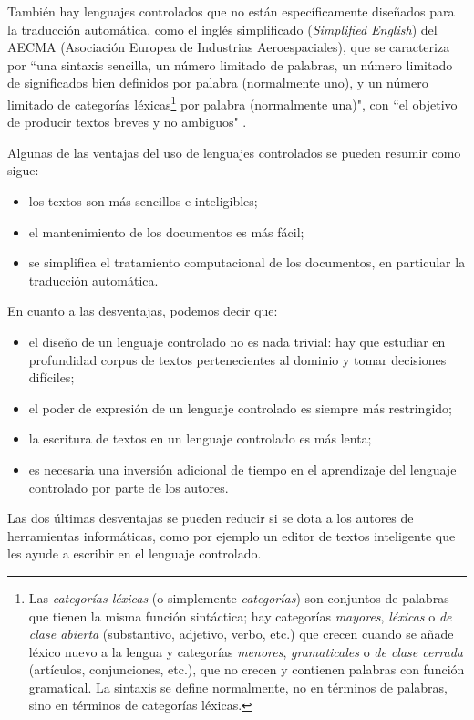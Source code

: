 También hay lenguajes controlados que no están específicamente diseñados para la traducción automática, como el inglés simplificado ({\em Simplified English}) del AECMA (Asociación Europea de Industrias Aeroespaciales), que se caracteriza por ``una sintaxis sencilla, un número limitado de palabras, un número limitado de significados bien definidos por palabra (normalmente uno), y un número limitado de categorías léxicas\footnote{Las \emph{categorías léxicas} (o simplemente \emph{categorías}) son conjuntos de palabras que tienen la misma función sintáctica; hay categorías \emph{mayores}, \emph{léxicas} o \emph{de clase abierta} (substantivo, adjetivo, verbo, etc.) que crecen cuando se añade léxico nuevo a la lengua y categorías \emph{menores}, \emph{gramaticales} o \emph{de clase cerrada} (artículos, conjunciones, etc.), que no crecen y contienen palabras con función gramatical. La sintaxis se define normalmente, no en términos de palabras, sino en términos de categorías léxicas.}\label{pg:catgra} por palabra (normalmente una)", con ``el objetivo de producir textos breves y no ambiguos" \citep{AECMA07u}. 

Algunas de las ventajas del uso de lenguajes controlados \citep{schwitten07u} se pueden resumir como sigue: \begin{itemize} \item los textos son más sencillos e inteligibles; \item el mantenimiento de los documentos es más fácil; \item se simplifica el tratamiento computacional de los documentos, en particular la traducción automática. \end{itemize} En cuanto a las desventajas, podemos decir que: \begin{itemize} \item el diseño de un lenguaje controlado no es nada trivial: hay que estudiar en profundidad corpus de textos pertenecientes al dominio y tomar decisiones difíciles; \item el poder de expresión de un lenguaje controlado es siempre más restringido; \item la escritura de textos en un lenguaje controlado es más lenta; \item es necesaria una inversión adicional de tiempo en el aprendizaje del lenguaje controlado por parte de los autores. \end{itemize} Las dos últimas desventajas se pueden reducir si se dota a los autores de herramientas informáticas, como por ejemplo un editor de textos inteligente que les ayude a escribir en el lenguaje controlado. 

